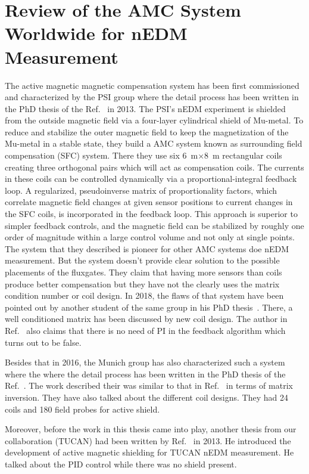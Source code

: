 \section{Review of the AMC System Worldwide for nEDM Measurement}

The active magnetic magnetic compensation system has been first commissioned and characterized by the PSI group where the detail process has been written in the PhD thesis of the Ref.~\cite{bea} in 2013. The PSI's nEDM experiment is shielded from the outside magnetic field via a four-layer cylindrical shield
of Mu-metal. To reduce and stabilize the outer magnetic field to keep the magnetization of the Mu-metal in a stable state, they build a AMC system known as surrounding field compensation (SFC) system. There they use 
six 6~m$\times$8~m rectangular coils creating three orthogonal pairs which will act as compensation coils. The currents in these coils
can be controlled dynamically via a proportional-integral feedback loop. A regularized, pseudoinverse matrix of proportionality factors, which correlate magnetic field changes at given sensor positions to current changes in the SFC coils, is incorporated in the feedback loop. This approach is superior to simpler feedback controls, and the magnetic field can be stabilized
by roughly one order of magnitude within a large control volume and not only at single points. The system that they described is pioneer for other AMC systems doe nEDM measurement. But the system doesn't provide clear solution to the possible placements of the fluxgates. They claim that having more sensors than coils produce better compensation but they have not the clearly uses the matrix condition number or coil design. In 2018, the flaws of that system have been pointed out by another student of the same group in his PhD thesis~\cite{rawlik}. There, a well conditioned matrix has been discussed by new coil design. The author in Ref.~\cite{rawlik} also claims that there is no need of PI in the feedback algorithm which turns out to be false.

Besides that in 2016, the Munich group has also characterized such a system where the where the detail process has been written in the PhD thesis of the Ref.~\cite{lins}. The work described their was similar to that in Ref.~\cite{bea} in terms of matrix inversion. They have also talked about the different coil designs. They had 24 coils and 180 field probes for active shield.

Moreover, before the work in this thesis came into play, another thesis from our collaboration (TUCAN) had been written by Ref.~\cite{mike} in 2013. He introduced the development of active magnetic shielding for TUCAN nEDM measurement. He talked about the PID control while there was no shield present.


